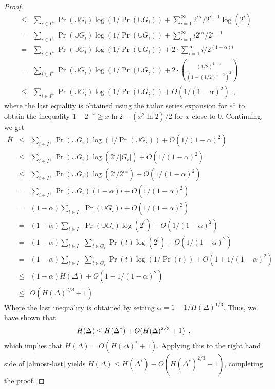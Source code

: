 \documentclass[lotsofwhite]{patmorin}
\begin{document}
\begin{proof}
\begin{eqnarray*}
 & \le & \sum_{i\in I^+}\Pr(\cup G_{i})\log(1/\Pr(\cup G_{i})) 
         + \sum_{i=1}^\infty 2^{\alpha i}/2^{i-1}\log(2^{i}) \\
 &  =  & \sum_{i\in I^+}\Pr(\cup G_{i})\log(1/\Pr(\cup G_{i})) 
         + \sum_{i=1}^\infty i2^{\alpha i}/2^{i-1} \\
 &  =  & \sum_{i\in I^+}\Pr(\cup G_{i})\log(1/\Pr(\cup G_{i})) 
         + 2\cdot\sum_{i=1}^{\infty} i/2^{(1-\alpha)i} \\
 &  =  & \sum_{i\in I^+}\Pr(\cup G_{i})\log(1/\Pr(\cup G_{i})) 
         + 2\cdot\left(\frac{(1/2)^{1-\alpha}}{(1-(1/2)^{1-\alpha})^2}\right) \\
 & \le & \sum_{i\in I^+}\Pr(\cup G_{i})\log(1/\Pr(\cup G_{i})) 
         + O(1/(1-\alpha)^2) \enspace ,
\end{eqnarray*}
where the last equality is obtained using the tailor series expansion
for $e^{x}$ to obtain the inequality $1-2^{-x} \ge x\ln 2 - (x^2\ln 2)/2$
for $x$ close to 0.  Continuing, we get 
\begin{eqnarray*}
\overline H
  & \le & \sum_{i\in I^+}\Pr(\cup G_{i})\log(1/\Pr(\cup G_{i})) 
         + O(1/(1-\alpha)^2) \\
  & \le & \sum_{i\in I^+}\Pr(\cup G_{i})\log(2^i/|G_i|)
         + O(1/(1-\alpha)^2) \\
  & \le & \sum_{i\in I^+}\Pr(\cup G_{i})\log(2^i/2^{\alpha i})
         + O(1/(1-\alpha)^2) \\
  &  =  & \sum_{i\in I^+}\Pr(\cup G_{i})(1-\alpha) i
         + O(1/(1-\alpha)^2) \\
  &  =  & (1-\alpha)\sum_{i\in I^+}\Pr(\cup G_{i}) i
         + O(1/(1-\alpha)^2) \\
  &  =  & (1-\alpha)\sum_{i\in I^+}\Pr(\cup G_{i})\log(2^i)
         + O(1/(1-\alpha)^2) \\
  &  =  & (1-\alpha)\sum_{i\in I^+}\sum_{t\in G_i}\Pr(t)\log(2^i)
         + O(1/(1-\alpha)^2) \\
  &  =  & (1-\alpha)\sum_{i\in I^+}\sum_{t\in G_i}\Pr(t)\log(1/\Pr(t))
         + O(1+1/(1-\alpha)^2) \\
  & \le & (1-\alpha)H(\Delta) + O(1+1/(1-\alpha)^2) \\
  & \le &  O(H(\Delta)^{2/3}+ 1)
\end{eqnarray*} 
Where the last inequality is obtained by setting 
$\alpha=1-1/H(\Delta)^{1/3}$.  Thus, we have shown that
\begin{equation}
  H(\Delta) \le H(\Delta^*) + O(H(\Delta)^{2/3}+1) \enspace ,
   \eqlabel{almost-last}
\end{equation}
which implies that $H(\Delta) = O(H(\Delta)^*+1)$.  Applying this to
the right hand side of \eqref{almost-last} yields $H(\Delta) \le
H(\Delta^*) + O(H(\Delta^*)^{2/3} + 1)$, completing the proof.
\end{proof}
\end{document}
